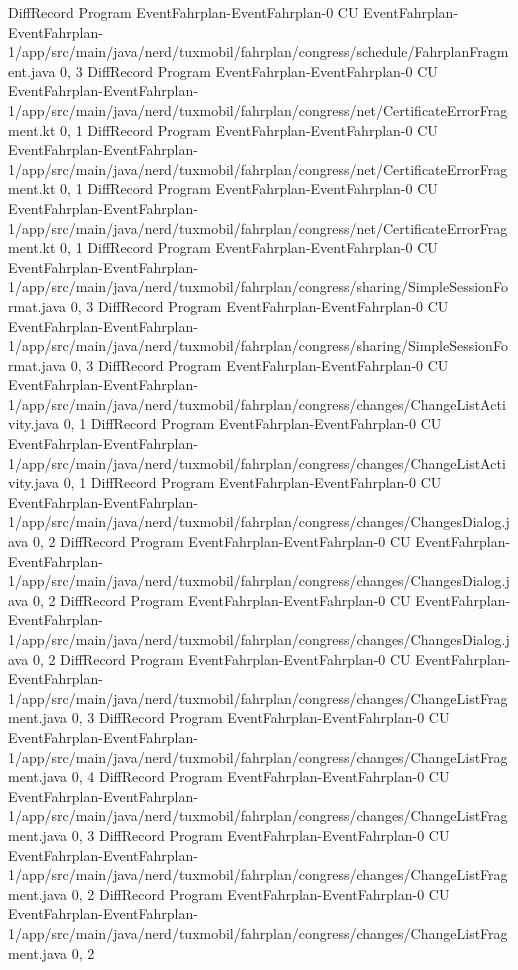 DiffRecord Program EventFahrplan-EventFahrplan-0 CU EventFahrplan-EventFahrplan-1/app/src/main/java/nerd/tuxmobil/fahrplan/congress/schedule/FahrplanFragment.java  {0, 3}
DiffRecord Program EventFahrplan-EventFahrplan-0 CU EventFahrplan-EventFahrplan-1/app/src/main/java/nerd/tuxmobil/fahrplan/congress/net/CertificateErrorFragment.kt  {0, 1}
DiffRecord Program EventFahrplan-EventFahrplan-0 CU EventFahrplan-EventFahrplan-1/app/src/main/java/nerd/tuxmobil/fahrplan/congress/net/CertificateErrorFragment.kt  {0, 1}
DiffRecord Program EventFahrplan-EventFahrplan-0 CU EventFahrplan-EventFahrplan-1/app/src/main/java/nerd/tuxmobil/fahrplan/congress/net/CertificateErrorFragment.kt  {0, 1}
DiffRecord Program EventFahrplan-EventFahrplan-0 CU EventFahrplan-EventFahrplan-1/app/src/main/java/nerd/tuxmobil/fahrplan/congress/sharing/SimpleSessionFormat.java  {0, 3}
DiffRecord Program EventFahrplan-EventFahrplan-0 CU EventFahrplan-EventFahrplan-1/app/src/main/java/nerd/tuxmobil/fahrplan/congress/sharing/SimpleSessionFormat.java  {0, 3}
DiffRecord Program EventFahrplan-EventFahrplan-0 CU EventFahrplan-EventFahrplan-1/app/src/main/java/nerd/tuxmobil/fahrplan/congress/changes/ChangeListActivity.java  {0, 1}
DiffRecord Program EventFahrplan-EventFahrplan-0 CU EventFahrplan-EventFahrplan-1/app/src/main/java/nerd/tuxmobil/fahrplan/congress/changes/ChangeListActivity.java  {0, 1}
DiffRecord Program EventFahrplan-EventFahrplan-0 CU EventFahrplan-EventFahrplan-1/app/src/main/java/nerd/tuxmobil/fahrplan/congress/changes/ChangesDialog.java  {0, 2}
DiffRecord Program EventFahrplan-EventFahrplan-0 CU EventFahrplan-EventFahrplan-1/app/src/main/java/nerd/tuxmobil/fahrplan/congress/changes/ChangesDialog.java  {0, 2}
DiffRecord Program EventFahrplan-EventFahrplan-0 CU EventFahrplan-EventFahrplan-1/app/src/main/java/nerd/tuxmobil/fahrplan/congress/changes/ChangesDialog.java  {0, 2}
DiffRecord Program EventFahrplan-EventFahrplan-0 CU EventFahrplan-EventFahrplan-1/app/src/main/java/nerd/tuxmobil/fahrplan/congress/changes/ChangeListFragment.java  {0, 3}
DiffRecord Program EventFahrplan-EventFahrplan-0 CU EventFahrplan-EventFahrplan-1/app/src/main/java/nerd/tuxmobil/fahrplan/congress/changes/ChangeListFragment.java  {0, 4}
DiffRecord Program EventFahrplan-EventFahrplan-0 CU EventFahrplan-EventFahrplan-1/app/src/main/java/nerd/tuxmobil/fahrplan/congress/changes/ChangeListFragment.java  {0, 3}
DiffRecord Program EventFahrplan-EventFahrplan-0 CU EventFahrplan-EventFahrplan-1/app/src/main/java/nerd/tuxmobil/fahrplan/congress/changes/ChangeListFragment.java  {0, 2}
DiffRecord Program EventFahrplan-EventFahrplan-0 CU EventFahrplan-EventFahrplan-1/app/src/main/java/nerd/tuxmobil/fahrplan/congress/changes/ChangeListFragment.java  {0, 2}
